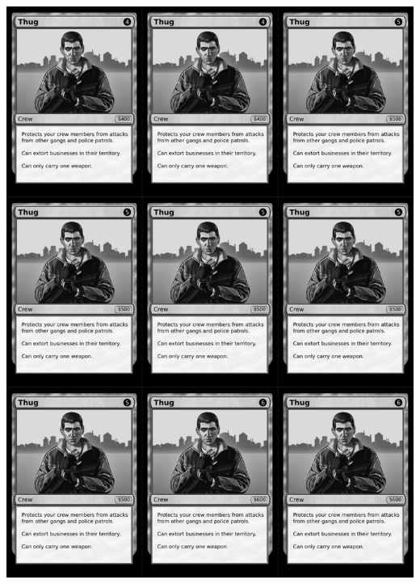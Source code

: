 \documentclass[a4paper]{article}
\begin{document}
\newpage

\begin{center}
	\centering
	\includegraphics[width=200.5mm,height=280.7mm]{output/temp/page18.png}
\end{center}
\end{document}
